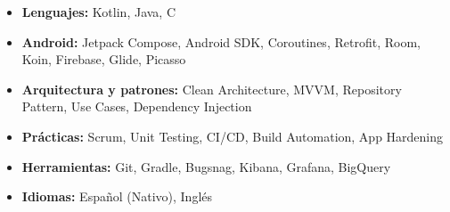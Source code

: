 \documentclass[11pt,a4paper]{article}
\begin{document}
\begin{itemize}[leftmargin=*]
    \item \textbf{Lenguajes:} Kotlin, Java, C
    \item \textbf{Android:} Jetpack Compose, Android SDK, Coroutines, Retrofit, Room, Koin, Firebase, Glide, Picasso
    \item \textbf{Arquitectura y patrones:} Clean Architecture, MVVM, Repository Pattern, Use Cases, Dependency Injection
    \item \textbf{Prácticas:} Scrum, Unit Testing, CI/CD, Build Automation, App Hardening
    \item \textbf{Herramientas:} Git, Gradle, Bugsnag, Kibana, Grafana, BigQuery
    \item \textbf{Idiomas:} Español (Nativo), Inglés
\end{itemize}
\end{document}
